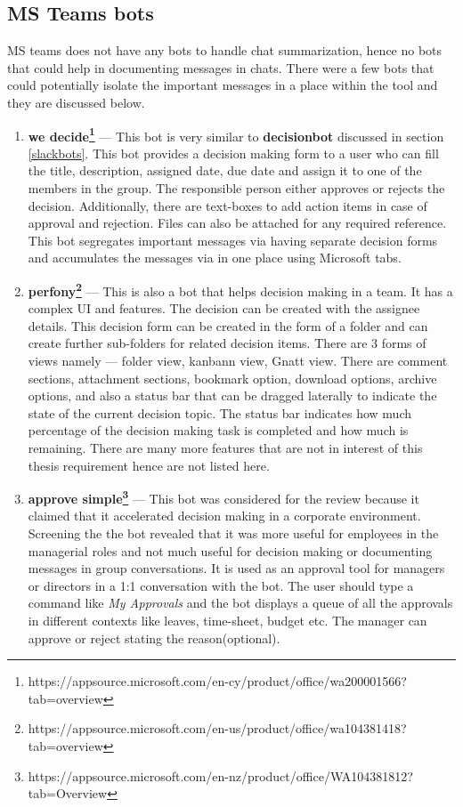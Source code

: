 \begin{enumerate}
\end{enumerate}


\subsection{MS Teams bots}

MS teams does not have any bots to handle chat summarization, hence no bots that could help in documenting messages in chats. There were a few bots that could potentially isolate the important messages in a place within the tool and they are discussed below.

\begin{enumerate}
\item \textbf{we decide\footnote{https://appsource.microsoft.com/en-cy/product/office/wa200001566?tab=overview}} —
This bot is very similar to \textbf{decisionbot} discussed in section \ref{slackbots}. This bot provides a decision making form to a user who can fill the title, description, assigned date, due date and assign it to one of the members in the group. The responsible person either approves or rejects the decision. Additionally, there are text-boxes to add action items in case of approval and rejection. Files can also be attached for any required reference. This bot segregates important messages via having separate decision forms and accumulates the messages via in one place using Microsoft tabs.

\item  \textbf{perfony\footnote{https://appsource.microsoft.com/en-us/product/office/wa104381418?tab=overview}} —
This is also a bot that helps decision making in a team. It has a complex UI and features. The decision can be created with the assignee details. This decision form can be created in the form of a folder and can create further sub-folders for related decision items. There are 3 forms of views namely — folder view, kanbann view, Gnatt view. There are comment sections, attachment sections, bookmark option, download options, archive options, and also a status bar that can be dragged laterally to indicate the state of the current decision topic. The status bar indicates how much percentage of the decision making task is completed and how much is remaining. There are many more features that are not in interest of this thesis requirement hence are not listed here.

\item  \textbf{approve simple\footnote{https://appsource.microsoft.com/en-nz/product/office/WA104381812?tab=Overview}} —
This bot was considered for the review because it claimed that it accelerated decision making in a corporate environment. Screening the the bot revealed that it was more useful for employees in the managerial roles and not much useful for decision making or documenting messages in group conversations. It is used as an approval tool for managers or directors in a 1:1 conversation with the bot. The user should type a command like \textit{My Approvals} and the bot displays a queue of all the approvals in different contexts like leaves, time-sheet, budget etc. The manager can approve or reject stating the reason(optional).
\end{enumerate}

